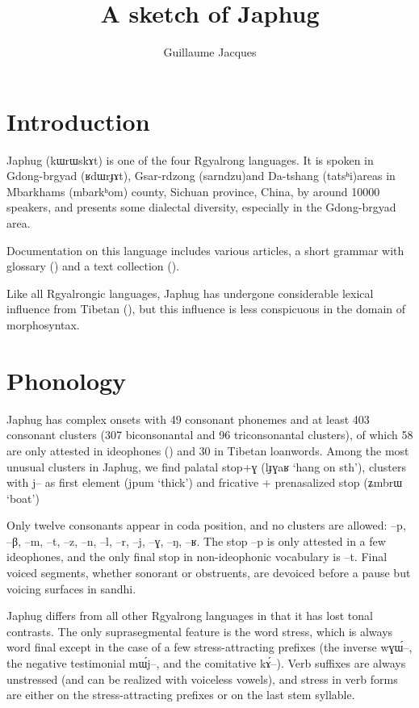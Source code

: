 \documentclass[oldfontcommands,oneside,a4paper,11pt]{article}
\newcommand{\ipa}[1]{{\phon #1}} %
\begin{document}
 

\title{A sketch of Japhug}
\author{Guillaume Jacques}
\maketitle

\section{Introduction}
Japhug (\ipa{kɯrɯskɤt}) is one of the four Rgyalrong languages. It is spoken in Gdong-brgyad (\ipa{ʁdɯrɟɤt}), Gsar-rdzong (\ipa{sarndzu})and Da-tshang (\ipa{tatsʰi})areas in Mbarkhams (\ipa{mbarkʰom}) county, Sichuan province, China, by around 10000 speakers, and presents some dialectal diversity, especially in the Gdong-brgyad area.

Documentation on this language includes various articles, a short grammar with glossary (\citealt{jacques08}) and a text collection (\citealt{jacques10gesar}).

Like all Rgyalrongic languages, Japhug has undergone considerable lexical influence from Tibetan (\citealt{jacques04these}), but this influence is less conspicuous in the domain of morphosyntax.



\section{Phonology}
Japhug has complex onsets with 49 consonant phonemes and at least 403 consonant clusters (307 biconsonantal and 96 triconsonantal clusters), of which 58 are only attested in ideophones (\citealt{japhug14ideophones}) and 30 in Tibetan loanwords. Among the most unusual clusters in Japhug, we find palatal stop+\ipa{ɣ} (\ipa{lɟɣaʁ} `hang on sth'), clusters with \ipa{j--} as first element (\ipa{jpum} `thick') and fricative + prenasalized stop (\ipa{ʑmbrɯ} `boat')


Only twelve   consonants appear in coda position, and no clusters are allowed:  \ipa{--p}, \ipa{--β}, \ipa{--m}, \ipa{--t}, \ipa{--z}, \ipa{--n}, \ipa{--l}, \ipa{--r}, \ipa{--j}, \ipa{--ɣ}, \ipa{--ŋ}, \ipa{--ʁ}. The stop \ipa{--p} is only attested in a few ideophones, and the only final stop in non-ideophonic vocabulary is \ipa{--t}. Final voiced segments, whether sonorant or obstruents, are devoiced before a pause but voicing surfaces in sandhi.

Japhug differs from all other Rgyalrong languages in that it has lost tonal contrasts. The only suprasegmental feature is the word stress, which is always word final except in the case of a few stress-attracting prefixes (the inverse \ipa{wɣɯ́--}, the negative testimonial \ipa{mɯ́j--}, and the comitative \ipa{kɤ́--}). Verb suffixes are always unstressed (and can be realized with voiceless vowels), and stress in verb forms are either on the stress-attracting prefixes or on the last stem syllable.
\end{document}

